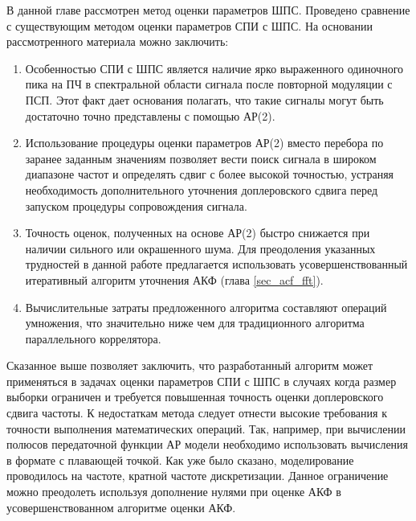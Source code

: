 В данной главе рассмотрен метод оценки параметров ШПС. Проведено сравнение с существующим методом оценки параметров СПИ с ШПС. На основании рассмотренного материала можно заключить:
\begin{enumerate}
\item Особенностью СПИ с ШПС является наличие ярко выраженного одиночного пика на ПЧ в спектральной области сигнала после повторной модуляции с ПСП.
	Этот факт дает основания полагать, что такие сигналы могут быть достаточно точно представлены с помощью АР(2).
\item Использование процедуры оценки параметров АР(2) вместо перебора по заранее заданным значениям позволяет вести поиск сигнала в широком диапазоне частот и определять сдвиг
	с более высокой точностью, устраняя необходимость дополнительного уточнения доплеровского сдвига перед запуском процедуры сопровождения сигнала.
\item Точность оценок, полученных на основе АР(2) быстро снижается при наличии сильного или окрашенного шума. Для преодоления указанных трудностей в 
	данной работе предлагается использовать усовершенствованный итеративный алгоритм уточнения АКФ (глава \ref{sec_acf_fft}).
\item Вычислительные затраты предложенного алгоритма составляют   операций умножения, что значительно ниже чем   для традиционного алгоритма параллельного коррелятора.
\end{enumerate}

Сказанное выше позволяет заключить, что разработанный алгоритм может применяться в задачах оценки параметров СПИ с ШПС в случаях когда размер выборки ограничен и
требуется повышенная точность оценки доплеровского сдвига частоты. К недостаткам метода следует отнести высокие требования к точности выполнения математических операций.
Так, например, при вычислении полюсов передаточной функции АР модели необходимо использовать вычисления в формате с плавающей точкой. 
Как уже было сказано, моделирование проводилось на частоте, кратной частоте дискретизации. Данное ограничение можно преодолеть используя дополнение нулями при оценке АКФ
в усовершенствованном алгоритме оценки АКФ.

\clearpage
